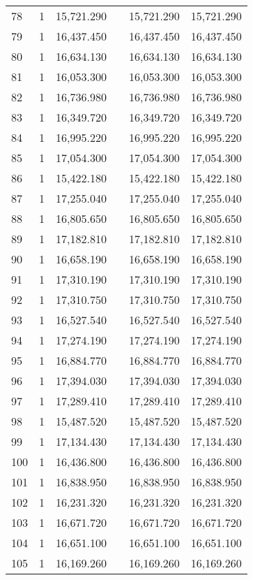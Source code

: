\begin{table}[!htbp]
\begin{tabular}{@{\extracolsep{5pt}}lccccc}
78 & 1 & 15,721.290 &  & 15,721.290 & 15,721.290 \\ 
79 & 1 & 16,437.450 &  & 16,437.450 & 16,437.450 \\ 
80 & 1 & 16,634.130 &  & 16,634.130 & 16,634.130 \\ 
81 & 1 & 16,053.300 &  & 16,053.300 & 16,053.300 \\ 
82 & 1 & 16,736.980 &  & 16,736.980 & 16,736.980 \\ 
83 & 1 & 16,349.720 &  & 16,349.720 & 16,349.720 \\ 
84 & 1 & 16,995.220 &  & 16,995.220 & 16,995.220 \\ 
85 & 1 & 17,054.300 &  & 17,054.300 & 17,054.300 \\ 
86 & 1 & 15,422.180 &  & 15,422.180 & 15,422.180 \\ 
87 & 1 & 17,255.040 &  & 17,255.040 & 17,255.040 \\ 
88 & 1 & 16,805.650 &  & 16,805.650 & 16,805.650 \\ 
89 & 1 & 17,182.810 &  & 17,182.810 & 17,182.810 \\ 
90 & 1 & 16,658.190 &  & 16,658.190 & 16,658.190 \\ 
91 & 1 & 17,310.190 &  & 17,310.190 & 17,310.190 \\ 
92 & 1 & 17,310.750 &  & 17,310.750 & 17,310.750 \\ 
93 & 1 & 16,527.540 &  & 16,527.540 & 16,527.540 \\ 
94 & 1 & 17,274.190 &  & 17,274.190 & 17,274.190 \\ 
95 & 1 & 16,884.770 &  & 16,884.770 & 16,884.770 \\ 
96 & 1 & 17,394.030 &  & 17,394.030 & 17,394.030 \\ 
97 & 1 & 17,289.410 &  & 17,289.410 & 17,289.410 \\ 
98 & 1 & 15,487.520 &  & 15,487.520 & 15,487.520 \\ 
99 & 1 & 17,134.430 &  & 17,134.430 & 17,134.430 \\ 
100 & 1 & 16,436.800 &  & 16,436.800 & 16,436.800 \\ 
101 & 1 & 16,838.950 &  & 16,838.950 & 16,838.950 \\ 
102 & 1 & 16,231.320 &  & 16,231.320 & 16,231.320 \\ 
103 & 1 & 16,671.720 &  & 16,671.720 & 16,671.720 \\ 
104 & 1 & 16,651.100 &  & 16,651.100 & 16,651.100 \\ 
105 & 1 & 16,169.260 &  & 16,169.260 & 16,169.260 \\ 

\end{tabular}
\end{table}
